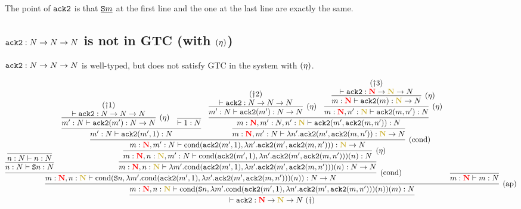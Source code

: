 The point of ${\tt ack2}$ is that $\underline{{\tt S}m}$ at the first line and the one at the last line are exactly the same.

\subsection{${\tt ack2}:{N}\to{N}\to{N}$ is not in GTC (with $\hbox{$(\eta)$}$)}

\begin{claim}
  ${\tt ack2}:{N}\to{N}\to{N}$ is well-typed, but does not satisfy GTC in the system with $\hbox{$(\eta)$}$.
\end{claim}

{\scriptsize
  \hspace{-3cm}
  $\infer{
    \vdash \AckB:\redN\to\goldN\to\N\ (\dagger)
  }{
    \infer[\Rap]{
      m:\redN, n:\goldN \vdash \Cond{\Suc{n}}{\lambda m'.\Cond{\AckB(m',1)}{\lambda n'.\AckB(m',\AckB(m,n'))}(n)}(m): \N
    }{
      \infer[\Rcond]{
        m:\redN, n:\goldN \vdash \Cond{\Suc{n}}{\lambda m'.\Cond{\AckB(m',1)}{\lambda n'.\AckB(m',\AckB(m,n'))}(n)}: \N\to\N
      }{
        \infer{
          n:\N \vdash \Suc{n}: \N
        }{
          \infer{
            n:\N \vdash n: \N
          }{}
        }
        &
        \infer{
          m:\redN, n:\goldN \vdash \lambda m'.\Cond{\AckB(m',1)}{\lambda n'.\AckB(m',\AckB(m,n'))}(n): \N\to\N
        }{
          \infer[\Reta]{
            m:\redN, n:\goldN, m':\N \vdash \Cond{\AckB(m',1)}{\lambda n'.\AckB(m',\AckB(m,n'))}(n): \N
          }{
            \infer[\Rcond]{
              m:\redN, m':\N \vdash \Cond{\AckB(m',1)}{\lambda n'.\AckB(m',\AckB(m,n'))}: \goldN\to\N
            }{
              \infer{
                m':\N \vdash \AckB(m',1): \N
              }{
                \infer[\Reta]{
                  m':\N \vdash \AckB(m'): \N\to\N
                }{
                  \deduce{
                    \vdash \AckB: \N\to\N\to\N
                  }{(\dagger1)}
                }
                &
                \infer{
                  \vdash 1:\N
                }{}
              }
              &
              \infer{
                m:\redN, m':\N \vdash \lambda n'.\AckB(m',\AckB(m,n')): \goldN\to\N
              }{
                \infer{
                  m:\redN, m':\N, n':\goldN \vdash \AckB(m',\AckB(m,n')): \N
                }{
                  \infer[\Reta]{
                    m':\N \vdash \AckB(m'): \N\to\N
                  }{
                    \deduce{
                      \vdash \AckB: \N\to\N\to\N
                    }{(\dagger2)}
                  }
                  &
                  \infer[\Reta]{
                    m:\redN, n':\goldN \vdash \AckB(m,n'): \N
                  }{
                    \infer[\Reta]{
                      m:\redN \vdash \AckB(m): \goldN\to\N
                    }{
                      \deduce{
                        \vdash \AckB: \redN\to\goldN\to\N
                      }{(\dagger3)}
                    }
                  }
                }
              }
            }
          }
        }
      }
      &
      \infer{
        m:\redN \vdash m:\N
      }{}
    }
  }$
}

